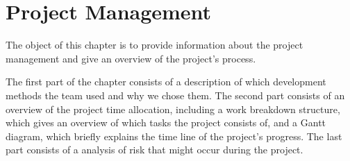 \chapter{Project Management}
The object of this chapter is to provide information about the project management and give an overview of the project's process. 

The first part of the chapter consists of a description of which development methods the team used and why we chose them. The second part consists of an overview of the project time allocation, including a work breakdown structure, which gives an overview of which tasks the project consists of, and a Gantt diagram, which briefly explains the time line of the project's progress. The last part consists of a analysis of risk that might occur during the project.




\newpage



